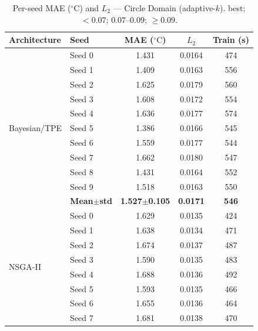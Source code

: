 \begin{table}[H]
\centering\small\setlength{\tabcolsep}{4pt}
\caption{Per-seed MAE ($^\circ\mathrm{C}$) and $L_2$ --- Circle Domain (adaptive-$k$).
\phantom{x} best; \phantom{x} ${<}0.07$; \phantom{x} $0.07$--$0.09$; \phantom{x} ${\geq}0.09$.}
\label{tab:adap_circle_seeds}
\begin{tabular}{@{}llccc@{}}
\toprule
Architecture & Seed & MAE ($^\circ\mathrm{C}$) & $L_2$ & Train (s) \\
\midrule
\multirow{11}{*}{Bayesian/TPE}
  & Seed 0 & {\small 1.431} & {\small 0.0164} & {\small 474} \\
  & Seed 1 & {\small 1.409} & {\small 0.0163} & {\small 556} \\
  & Seed 2 & {\small 1.625} & {\small 0.0179} & {\small 560} \\
  & Seed 3 & {\small 1.608} & {\small 0.0172} & {\small 554} \\
  & Seed 4 & {\small 1.636} & {\small 0.0177} & {\small 574} \\
  & Seed 5 & {\small 1.386} & {\small 0.0166} & {\small 545} \\
  & Seed 6 & {\small 1.559} & {\small 0.0177} & {\small 544} \\
  & Seed 7 & {\small 1.662} & {\small 0.0180} & {\small 547} \\
  & Seed 8 & {\small 1.431} & {\small 0.0164} & {\small 552} \\
  & Seed 9 & {\small 1.518} & {\small 0.0163} & {\small 550} \\
  & \textbf{Mean$\pm$std} & \textbf{1.527$\pm$0.105} & \cellcolor{ForestGreen!25}\textbf{0.0171} & \textbf{546} \\
\midrule
\multirow{11}{*}{NSGA-II}
  & Seed 0 & {\small 1.629} & {\small 0.0135} & {\small 424} \\
  & Seed 1 & {\small 1.638} & {\small 0.0134} & {\small 471} \\
  & Seed 2 & {\small 1.674} & {\small 0.0137} & {\small 487} \\
  & Seed 3 & {\small 1.590} & {\small 0.0135} & {\small 483} \\
  & Seed 4 & {\small 1.688} & {\small 0.0136} & {\small 492} \\
  & Seed 5 & {\small 1.593} & {\small 0.0135} & {\small 466} \\
  & Seed 6 & {\small 1.655} & {\small 0.0136} & {\small 464} \\
  & Seed 7 & {\small 1.681} & {\small 0.0138} & {\small 470} \\

\end{tabular}
\end{table}
